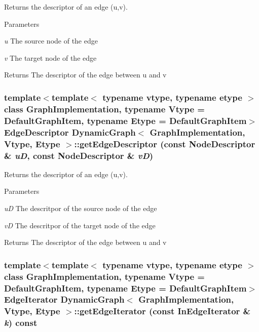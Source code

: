 Returns the descriptor of an edge (u,v). 


\begin{DoxyParams}{Parameters}
\item[{\em u}]The source node of the edge \item[{\em v}]The target node of the edge \end{DoxyParams}
\begin{DoxyReturn}{Returns}
The descriptor of the edge between u and v 
\end{DoxyReturn}
\hypertarget{class_dynamic_graph_a1b007b348fca01228dedc6bf93e14e70}{
\subsubsection[{getEdgeDescriptor}]{\setlength{\rightskip}{0pt plus 5cm}template$<$template$<$ typename vtype, typename etype $>$ class GraphImplementation, typename Vtype  = DefaultGraphItem, typename Etype  = DefaultGraphItem$>$ EdgeDescriptor {\bf DynamicGraph}$<$ GraphImplementation, Vtype, Etype $>$::getEdgeDescriptor (const NodeDescriptor \& {\em uD}, \/  const NodeDescriptor \& {\em vD})}}
\label{class_dynamic_graph_a1b007b348fca01228dedc6bf93e14e70}


Returns the descriptor of an edge (u,v). 


\begin{DoxyParams}{Parameters}
\item[{\em uD}]The descritpor of the source node of the edge \item[{\em vD}]The descritpor of the target node of the edge \end{DoxyParams}
\begin{DoxyReturn}{Returns}
The descriptor of the edge between u and v 
\end{DoxyReturn}
\hypertarget{class_dynamic_graph_a396484a350c5e3161720e0ce60877214}{
\subsubsection[{getEdgeIterator}]{\setlength{\rightskip}{0pt plus 5cm}template$<$template$<$ typename vtype, typename etype $>$ class GraphImplementation, typename Vtype  = DefaultGraphItem, typename Etype  = DefaultGraphItem$>$ EdgeIterator {\bf DynamicGraph}$<$ GraphImplementation, Vtype, Etype $>$::getEdgeIterator (const InEdgeIterator \& {\em k}) const}}
\label{class_dynamic_graph_a396484a350c5e3161720e0ce60877214}


